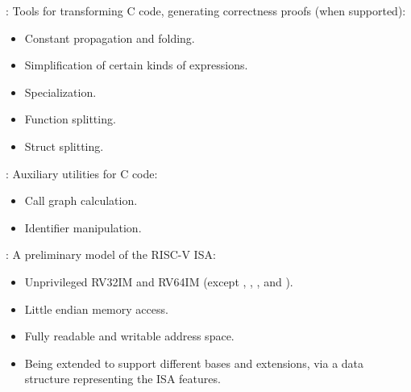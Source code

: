 
\begin{frame}

\newlibtitle

:
Tools for transforming C code,
generating correctness proofs (when supported):
\begin{itemize}
\item Constant propagation and folding.
\item Simplification of certain kinds of expressions.
\item Specialization.
\item Function splitting.
\item Struct splitting.
\end{itemize}

\separation

:
Auxiliary utilities for C code:
\begin{itemize}
\item Call graph calculation.
\item Identifier manipulation.
\end{itemize}

\end{frame}


\begin{frame}

\newlibtitle

:
A preliminary model of the RISC-V ISA:
\begin{itemize}
\item Unprivileged RV32IM and RV64IM
      (except , , , and ).
\item Little endian memory access.
\item Fully readable and writable address space.
\item Being extended to support different bases and extensions,
      via a data structure representing the ISA features.
\end{itemize}

\end{frame}


